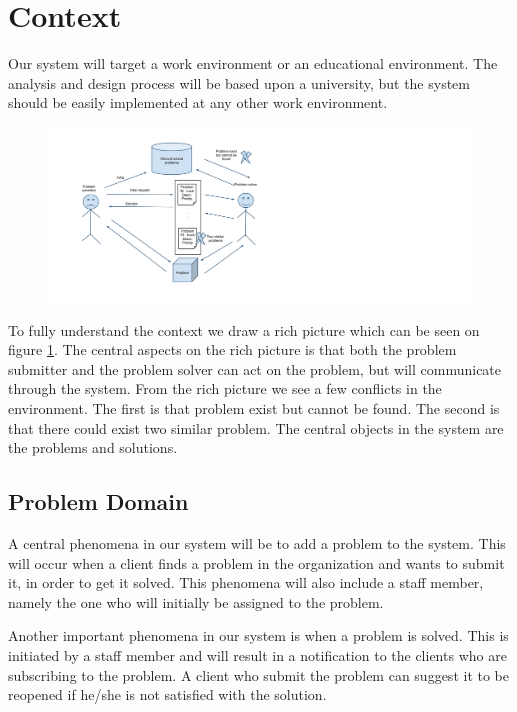 \section{Context}
Our system will target a work environment or an educational environment.
The analysis and design process will be based upon a university, but the system should be easily implemented at any other work environment. 

\begin{figure}[H]%
\includegraphics[scale = 0.45]{input/background/rich_picture.pdf}%
%
\label{fig:rich_picture}%
\end{figure}

To fully understand the context we draw a rich picture which can be seen on figure \ref{fig:rich_picture}. 
The central aspects on the rich picture is that both the problem submitter and the problem solver can act on the problem, but will communicate through the system. 
From the rich picture we see a few conflicts in the environment. 
The first is that problem exist but cannot be found.
The second is that there could exist two similar problem.
The central objects in the system are the problems and solutions.

\subsection{Problem Domain}
A central phenomena in our system will be to add a problem to the system.
This will occur when a client finds a problem in the organization and wants to submit it, in order to get it solved.
This phenomena will also include a staff member, namely the one who will initially be assigned to the problem.

Another important phenomena in our system is when a problem is solved.
This is initiated by a staff member and will result in a notification to the clients who are subscribing to the problem.
A client who submit the problem can suggest it to be reopened if he/she is not satisfied with the solution.

